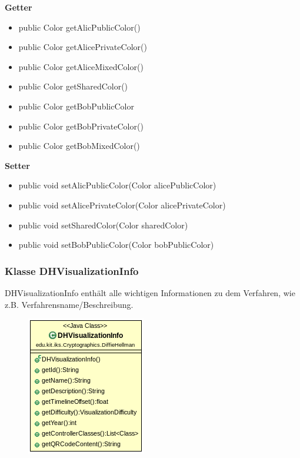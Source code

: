 \documentclass{article}
\begin{document}
      \textbf{Getter}
      \begin{itemize}
        \item public Color getAlicPublicColor()
        \item public Color getAlicePrivateColor()
        \item public Color getAliceMixedColor()
        \item public Color getSharedColor()
        \item public Color getBobPublicColor
        \item public Color getBobPrivateColor()
        \item public Color getBobMixedColor()
      \end{itemize}

      \textbf{Setter}
      \begin{itemize}
        \item public void setAlicPublicColor(Color alicePublicColor)
        \item public void setAlicePrivateColor(Color alicePrivateColor)
        \item public void setSharedColor(Color sharedColor)
        \item public void setBobPublicColor(Color bobPublicColor)
      \end{itemize}

\subsubsection{Klasse DHVisualizationInfo}
      DHVisualizationInfo enthält alle wichtigen Informationen zu dem Verfahren, wie z.B. Verfahrensname/Beschreibung.
      \begin{figure}[H]
        \centering
        \includegraphics{resources/edu-kit-iks-Cryptographics-DiffieHellman-DHVisualizationInfo}
      \end{figure}
\end{document}
